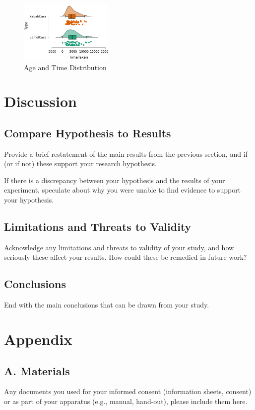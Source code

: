 \documentclass{article}
\begin{document}
\begin{figure}[H]
    \centering
    \includegraphics[width=0.4\textwidth]{difference_type_statistics.png}
    \caption{Age and Time Distribution}
\end{figure}

\section{Discussion}
\subsection{Compare Hypothesis to Results}
Provide a brief restatement of the main results from the previous section, and if (or if not) these support your research hypothesis.

If there is a discrepancy between your hypothesis and the results of your experiment, speculate about why you were unable to find evidence to support your hypothesis.


\subsection{Limitations and Threats to Validity}Acknowledge any limitations and threats to validity of your study, and how seriously these affect your results. How could these be remedied in future work?

\subsection{Conclusions}

End with the main conclusions that can be drawn from your study.


\section{Appendix}
\subsection*{A. Materials}

Any documents you used for your informed consent (information sheets, consent) or as part of your apparatus (e.g., manual, hand-out), please include them here.
\end{document}
